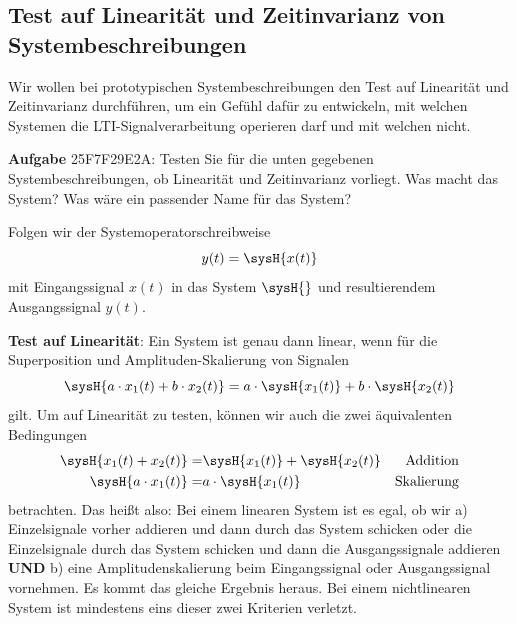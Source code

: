 \subsection{Test auf Linearität und Zeitinvarianz von Systembeschreibungen}
\label{sec:25F7F29E2A}
\begin{Ziel}
Wir wollen bei prototypischen Systembeschreibungen den Test auf
Linearität und Zeitinvarianz durchführen, um ein Gefühl dafür zu entwickeln,
mit welchen Systemen die LTI-Signalverarbeitung operieren darf und mit welchen nicht.
\end{Ziel}
\textbf{Aufgabe} {\tiny 25F7F29E2A}: Testen Sie für die unten gegebenen
Systembeschreibungen, ob Linearität und Zeitinvarianz vorliegt.
Was macht das System? Was wäre ein passender Name für das System?
\begin{Werkzeug}
Folgen wir der Systemoperatorschreibweise
\begin{equation}
y(t) = \sysH{x(t)}
\end{equation}
mit Eingangssignal $x(t)$ in das System $\sysH{}$ und resultierendem
Ausgangssignal $y(t)$.

\textbf{Test auf Linearität}:
%
Ein System ist genau dann linear, wenn für die Superposition und Amplituden-Skalierung
von Signalen
\begin{equation}
\sysH{a\cdot x_1(t) + b\cdot x_2(t)} = a\cdot\sysH{x_1(t)} + b\cdot\sysH{x_2(t)}
\end{equation}
gilt.
Um auf Linearität zu testen, können wir auch die zwei äquivalenten Bedingungen
\begin{align}
\sysH{x_1(t) + x_2(t)} =& \sysH{x_1(t)} + \sysH{x_2(t)} &\text{Addition}\\
\sysH{a \cdot x_1(t)} =& a \cdot \sysH{x_1(t)} &\text{Skalierung}
\end{align}
betrachten.
Das heißt also: Bei einem linearen System ist es egal, ob wir a) Einzelsignale
vorher addieren und dann durch das System schicken oder die Einzelsignale durch das
System schicken und dann die Ausgangssignale addieren \textbf{UND} b)
eine Amplitudenskalierung beim Eingangssignal oder Ausgangssignal vornehmen. Es kommt
das gleiche Ergebnis heraus. Bei einem nichtlinearen System ist mindestens eins dieser
zwei Kriterien verletzt.


\end{Werkzeug}
